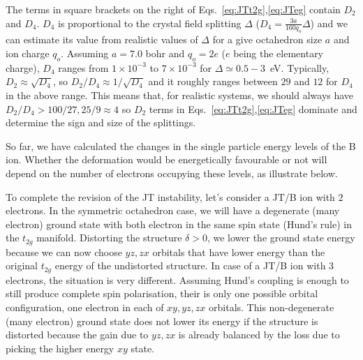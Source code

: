 \documentclass[a4paper,prb]{revtex4-1}  %
\begin{document}
The terms in square brackets on the right of Eqs.~\ref{eq:JTt2g},\ref{eq:JTeg}
contain $D_2$ and $D_4$. 
$D_4$ is proportional to the crystal field splitting $\Delta$ 
($D_4=\frac{3a}{160q_o} \Delta$) and 
we can estimate its value from realistic values of $\Delta$ for a give octahedron size $a$ and ion charge $q_o$. 
Assuming $a=7.0$ bohr and $q_o=2e$ ($e$ being the elementary charge),
$D_4$ ranges from $1 \times 10^{-3}$ to  $7 \times 10^{-3}$
for $\Delta \simeq 0.5-3$~eV.
Typically, ${D_{2}\approx \sqrt{D_{4}}}$,
so $D_{2}/D_{4} \approx 1/\sqrt{D_{4}}$
and it roughly ranges between $29$ and $12$ for $D_4$ in the above range.
This means that, for realistic systems, 
we should always have $D_{2}/D_{4} > 100/27, 25/9 \approx 4$
so 
$D_{2}$ terms in 
Eqs.~\ref{eq:JTt2g},\ref{eq:JTeg}
dominate and determine the sign and size of the splittings.


So far, we have calculated the changes in the single particle energy levels of the B ion. 
Whether the deformation would be energetically favourable 
or not will depend on the number of electrons occupying these levels,
as illustrate below.


To complete the revision of the JT instability,
let's consider %
a JT/B ion with $2$ electrons.
In the symmetric octahedron case, 
we will have a degenerate (many electron) ground state 
with both electron in the same spin state (Hund's rule) in the $t_{2g}$ manifold.
Distorting the structure $\delta>0$, we lower the ground state energy because 
we can now choose $yz,zx$ orbitals that have lower energy than the original $t_{2g}$ energy of the undistorted structure.
In case of a JT/B ion with $3$ electrons, the situation is very different.
Assuming Hund's coupling is enough to still produce complete spin polarisation,
their is only one possible orbital configuration, one electron in each of $xy,yz,zx$ orbitals.
This non-degenerate (many electron) ground state
does not lower its energy if the structure is distorted 
because the gain due to $yz,zx$ is already balanced by the loss due to picking the higher energy $xy$ state.
\end{document}
